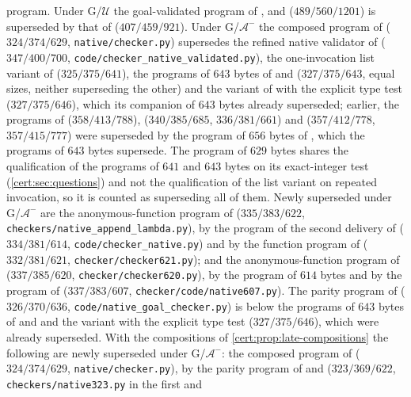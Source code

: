 program. Under G/$\mathcal U$
the goal-validated program of , 
and  ($489/560/1201$) is superseded by that of
 ($407/459/921$). Under G/$\mathcal A^{-}$ the
composed program of  ($324/374/629$,
\texttt{native/checker.py}) supersedes the refined native validator of
 ($347/400/700$,
\texttt{code/checker\_native\_validated.py}), the one-invocation list variant
of  ($325/375/641$), the programs of $643$ bytes of
 and  ($327/375/643$, equal sizes,
neither superseding the other) and the variant of  with
the explicit type test ($327/375/646$), which its companion of $643$ bytes
already superseded; earlier, the programs of 
($358/413/788$),  ($340/385/685$, $336/381/661$) and
 ($357/412/778$, $357/415/777$) were superseded by the program
of $656$ bytes of , which the programs of
$643$ bytes supersede. The program of $629$ bytes shares the qualification of
the programs of $641$ and $643$ bytes on its exact-integer test
(\cref{cert:sec:questions}) and not the qualification of the list variant on
repeated invocation, so it is counted as superseding all of them. Newly
superseded under G/$\mathcal A^{-}$ are the anonymous-function program of
 ($335/383/622$, \texttt{checkers/native\_append\_lambda.py}),
by the program of the second delivery of 
($334/381/614$, \texttt{code/checker\_native.py}) and by the function program
of  ($332/381/621$, \texttt{checker/checker621.py}); and the
anonymous-function program of  ($337/385/620$,
\texttt{checker/checker620.py}), by the program of $614$ bytes and by the
program of  ($337/383/607$,
\texttt{checker/code/native607.py}). The parity program of
 ($326/370/636$,
\texttt{code/native\_goal\_checker.py}) is below the programs of $643$ bytes of
 and  and the variant with the explicit
type test ($327/375/646$), which were already superseded. With the
compositions of \cref{cert:prop:late-compositions} the following are newly
superseded under G/$\mathcal A^{-}$: the composed program of
 ($324/374/629$, \texttt{native/checker.py}), by the
parity program of  and 
($323/369/622$, \texttt{checkers/native323.py} in the first and
